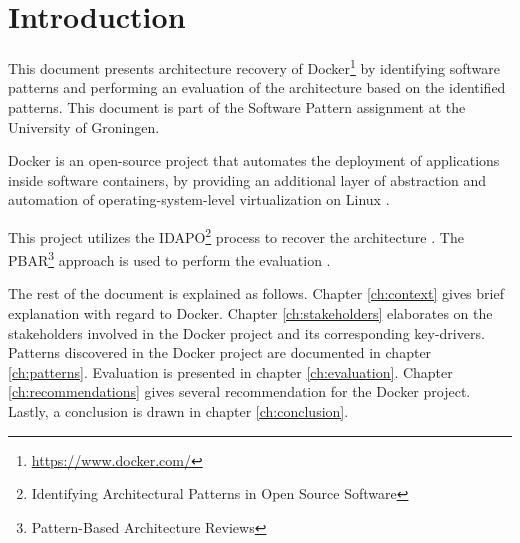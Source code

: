 \clearpage
\chapter{Introduction}
\label{ch:introduction}
This document presents architecture recovery of Docker\footnote{\url{https://www.docker.com/}} by identifying software patterns and performing an evaluation of the architecture based on the identified patterns. This document is part of the Software Pattern assignment at the University of Groningen.


Docker is an open-source project that automates the deployment of applications inside software containers, by providing an additional layer of abstraction and automation of operating-system-level virtualization on Linux \cite{dockerdef}. 

This project utilizes the IDAPO\footnote{Identifying Architectural Patterns in Open Source Software} process to recover the architecture \cite{idapo}. The PBAR\footnote{Pattern-Based Architecture Reviews} approach is used to perform the evaluation \cite{pbar}.




The rest of the document is explained as follows. Chapter \ref{ch:context} gives brief explanation with regard to Docker. Chapter \ref{ch:stakeholders} elaborates on the stakeholders involved in the Docker project and its corresponding key-drivers. Patterns discovered in the Docker project are documented in chapter \ref{ch:patterns}. Evaluation is presented in chapter \ref{ch:evaluation}. Chapter \ref{ch:recommendations} gives several recommendation for the Docker project. Lastly, a conclusion is drawn in chapter \ref{ch:conclusion}.